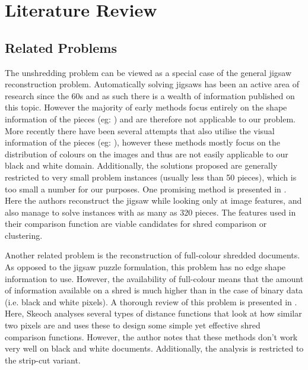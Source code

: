 \chapter{Literature Review}
\label{chap3}

\section{Related Problems}
The unshredding problem can be viewed as a special case of the general jigsaw reconstruction problem. Automatically solving jigsaws has been an active area of research since the 60s \cite{P21} and as such there is a wealth of information published on this topic. However the majority of early methods focus entirely on the shape information of the pieces (eg: \cite{P21,P22}) and are therefore not applicable to our problem. More recently there have been several attempts that also utilise the visual information of the pieces (eg: \cite{P23,P24}), however these methods mostly focus on the distribution of colours on the images and thus are not easily applicable to our black and white domain. Additionally, the solutions proposed are generally restricted to very small problem instances (usually less than 50 pieces), which is too small a number for our purposes. One promising method is presented in \cite{P25}. Here the authors reconstruct the jigsaw while looking only at image features, and also manage to solve instances with as many as 320 pieces. The features used in their comparison function are viable candidates for shred comparison or clustering.

Another related problem is the reconstruction of full-colour shredded documents. As opposed to the jigsaw puzzle formulation, this problem has no edge shape information to use. However, the availability of full-colour means that the amount of information available on a shred is much higher than in the case of binary data (i.e. black and white pixels). A thorough review of this problem is presented in \cite{P26}. Here, Skeoch analyses several types of distance functions that look at how similar two pixels are and uses these to design some simple yet effective shred comparison functions. However, the author notes that these methods don't work very well on black and white documents. Additionally, the analysis is restricted to the strip-cut variant.

